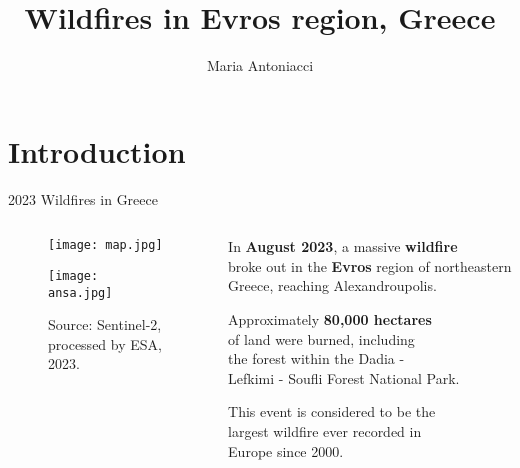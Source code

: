 \documentclass{beamer}
\title{Wildfires in Evros region, Greece}
\author{Maria Antoniacci}
\institute{Scienze e Gestione della Natura - Unibo}
\begin{document}
\maketitle


\section{Introduction} %

\begin{frame}{2023 Wildfires in Greece}

\begin{columns}

    \begin{column}{0.65\textwidth}
    \begin{figure}
    \centering
    \texttt{[image: map.jpg]}
    \end{figure}
    
     \begin{figure}
     \centering
     \texttt{[image: ansa.jpg]}
    
    {\tiny{Source: Sentinel-2, processed by ESA, 2023.}}
   \end{figure}  
    
    \end{column}

    \begin{column}{0.5\textwidth}
        \scriptsize In \textbf{August 2023}, a massive \textbf{wildfire}\\ broke out in the \textbf{Evros} region of northeastern Greece, reaching Alexandroupolis.
        
        \bigskip
        Approximately \textbf{80,000 hectares}\\ of land were burned, including\\ the forest within the Dadia -\\ Lefkimi - Soufli Forest National Park.
        
        \bigskip
        This event is considered to be the\\ largest wildfire ever recorded in \\ Europe since 2000. 
       
    \end{column}
    
\end{columns}
\end{frame}
\end{document}
